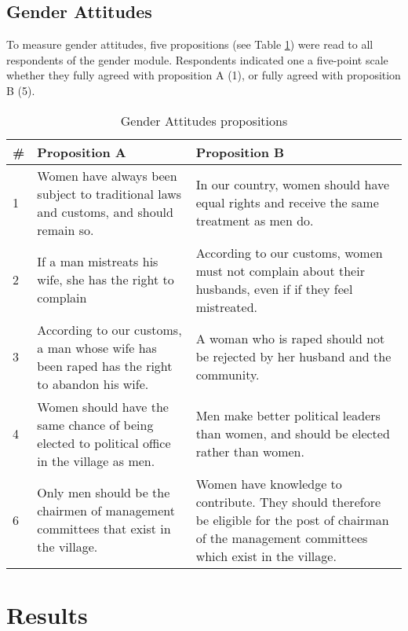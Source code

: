 \documentclass[10pt,a4paper,abstract=on]{scrartcl} %
\newcommand{\tableloc}{C:/Users/Koen/Dropbox/PhD/Papers/CongoGBV/Tables}
\begin{document}
\subsection*{Gender Attitudes}
 To measure gender attitudes, five propositions (see Table \ref{tab:genderatt}) were read to all respondents of the gender module. Respondents indicated one a five-point scale whether they fully agreed with proposition A (1), or fully agreed with proposition B (5). 
\begin{table}[htb]
\centering
\caption{Gender Attitudes propositions}
\label{tab:genderatt}
\begin{tabularx}{\textwidth}{l X X}
\toprule
\# & Proposition A & Proposition B \\
\hline
1 & Women have always been subject to traditional laws and customs, and should remain so. &	In our country, women should have equal rights and receive the same treatment as men do. \\
2 & If a man mistreats his wife, she has the right to complain &	According to our customs, women must not complain about their husbands, even if if they feel mistreated. \\
3 & According to our customs, a man whose wife has been raped has the right to abandon his wife. &	A woman who is raped should not be rejected by her husband and the community. \\
4 & Women should have the same chance of being elected to political office in the village as men. & 	 Men make better political leaders  than women, and should be elected rather than women. \\
6 & Only men should be the chairmen of management committees that exist in the village. &	Women have knowledge to contribute. They should therefore be eligible for the post of chairman of the management committees which exist in the village. \\
\bottomrule
\end{tabularx}
\end{table}






\section*{Results}
\newcommand{\incid}[2]{\csvreader[filter strcmp={\key}{#1}]{\tableloc/incidence.csv}{key=\key,#2=\inc}{\inc}}
\end{document}

